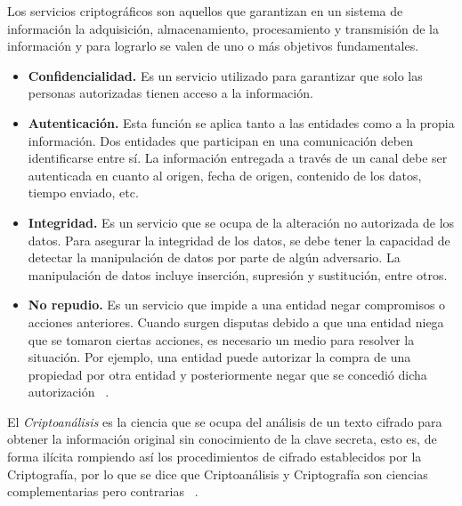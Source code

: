Los servicios criptográficos son aquellos que garantizan en un sistema de información la adquisición, almacenamiento, procesamiento y transmisión de la información y para lograrlo se valen de uno o más objetivos fundamentales. 
\begin{itemize}
\item \textbf{Confidencialidad. }
Es un servicio utilizado para garantizar que solo las personas autorizadas tienen acceso a la información.

\item \textbf{Autenticación. }
Esta función se aplica tanto a las entidades como a la propia información. Dos entidades que participan en una comunicación deben identificarse entre sí. La información entregada a través de un canal debe ser autenticada en cuanto al origen, fecha de origen, contenido de los datos, tiempo enviado, etc. 

\item \textbf{Integridad. }
Es un servicio que se ocupa de la alteración no autorizada de los datos. Para asegurar la integridad de los datos, se debe tener la capacidad de detectar la manipulación de datos por parte de algún adversario. La manipulación de datos incluye inserción, supresión y sustitución, entre otros.

\item \textbf{No repudio. }
Es un servicio que impide a una entidad negar compromisos o acciones anteriores. Cuando surgen disputas debido a que una entidad niega que se tomaron ciertas acciones, es necesario un medio para resolver la situación. Por ejemplo, una entidad puede autorizar la compra de una propiedad por otra entidad y posteriormente negar que se concedió dicha autorización ~\cite{menezes}.
\end{itemize}


El \textit{ Criptoanálisis } es la ciencia que se ocupa del análisis de un texto cifrado para obtener la información original sin conocimiento de la clave secreta, esto es, de forma ilícita rompiendo así los procedimientos de cifrado establecidos por la Criptografía, por lo que se dice que Criptoanálisis y Criptografía son ciencias complementarias pero contrarias ~\cite{cripto}. \\


